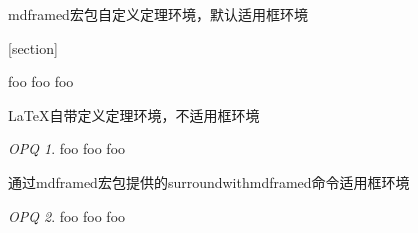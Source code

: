 \documentclass{article}
\begin{document}
mdframed宏包自定义定理环境，默认适用框环境
\theoremstyle{remark}
[section]
\begin{remark}
    foo foo foo
\end{remark}



\LaTeX{}自带定义定理环境，不适用框环境
\newtheorem{opq}{OPQ}
\begin{opq}
    foo foo foo
\end{opq}

通过mdframed宏包提供的surroundwithmdframed命令适用框环境
\begin{opq}
    foo foo foo
\end{opq}

\end{document}

